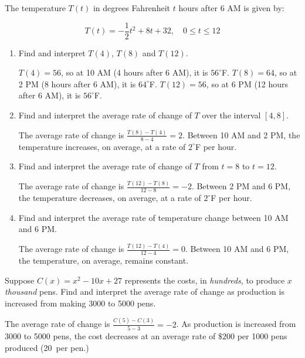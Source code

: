 \documentclass{ximera}
\begin{document}
\begin{problem}
The temperature $T(t)$ in degrees Fahrenheit $t$ hours after 6 AM is given by:

\[ T(t) = -\frac{1}{2} t^2 + 8t+32, \quad 0 \leq t \leq 12\]

\begin{enumerate}

\item  Find and interpret $T(4)$, $T(8)$ and $T(12)$.

\begin{solution}
$T(4) = 56$, so at 10 AM (4 hours after 6 AM), it is $56^{\circ}$F.  $T(8) = 64$, so at 2 PM (8 hours after 6 AM), it is $64^{\circ}$F.  $T(12) = 56$, so at 6 PM (12 hours after 6 AM), it is $56^{\circ}$F.
\end{solution}

\item  Find and interpret the average rate of change of $T$ over the interval $[4,8]$.

\begin{solution}
The average rate of change is $\frac{T(8)-T(4)}{8-4}=2$.  Between 10 AM and 2 PM, the temperature increases, on average, at a rate of $2^{\circ}$F per hour.
\end{solution}

\item  Find and interpret the average rate of change of $T$ from $t=8$ to $t=12$.

\begin{solution}
The average rate of change is $\frac{T(12)-T(8)}{12-8}=-2$.  Between 2 PM and 6 PM, the temperature decreases, on average, at a rate of $2^{\circ}$F per hour.
\end{solution}

\item  Find and interpret the average rate of temperature change between 10 AM and 6 PM.

\begin{solution}
The average rate of change is $\frac{T(12)-T(4)}{12-4}=0$.  Between 10 AM and 6 PM, the temperature, on average, remains constant.
\end{solution}

\end{enumerate}
\end{problem}

\begin{problem}
Suppose $C(x) = x^2-10x+27$ represents the costs, in \textit{hundreds}, to produce $x$ \textit{thousand} pens.  Find and interpret the average rate of change as production is increased from making 3000 to 5000 pens.

\begin{solution}
The average rate of change is $\frac{C(5)-C(3)}{5-3}=-2$.  As production is increased from 3000 to 5000 pens, the cost decreases at an average rate of  $\$200$ per 1000 pens produced (20\textcent \, per pen.)
\end{solution}
\end{problem}
\end{document}
